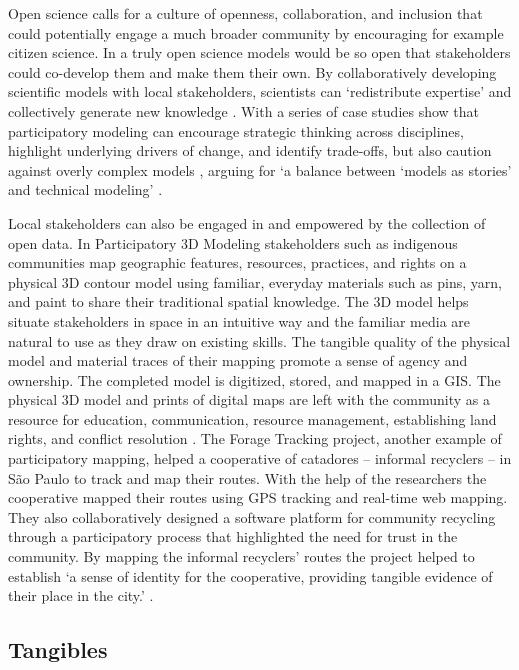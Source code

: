 \documentclass{article}
\begin{document}
Open science calls for a culture of openness, collaboration, and inclusion
that could potentially engage a much broader community 
by encouraging for example citizen science. 
%
In a truly open science
models would be so open that stakeholders could co-develop them
and make them their own. 
%
By collaboratively developing scientific models 
with local stakeholders, scientists can 
`redistribute expertise' 
and collectively generate new knowledge \citep{Whatmore2011, Landstrom2011}. 
%
With a series of case studies 
\citeauthor{Sandker2010} show
that participatory modeling can 
encourage strategic thinking across disciplines, 
highlight underlying drivers of change, 
and identify trade-offs,
but also caution against overly complex models
, arguing for 
`a balance between `models as stories' and technical
modeling'
\citeyearpar{Sandker2010}.  
%

Local stakeholders can also be engaged in and empowered by the collection of open data. 
%
In Participatory 3D Modeling stakeholders such as indigenous communities 
map 
geographic features, resources, practices, and rights 
on a physical 3D contour model 
using familiar, everyday materials such as pins, yarn, and paint 
to share their traditional spatial knowledge. 
The 3D model helps situate stakeholders in space in an intuitive way
and the familiar media are natural to use as they draw on existing skills.
The tangible quality of the physical model and material traces of their mapping 
promote a sense of agency and ownership. 
%
The completed model is digitized, stored, and mapped in a GIS. 
The physical 3D model and prints of digital maps are left with the community
as a resource for
education, communication, resource management, establishing land rights, and conflict resolution 
\citep{Rambaldi2001}.
%
The Forage Tracking project, another example of participatory mapping, helped a cooperative of catadores -- informal recyclers -- 
in S\~{a}o Paulo to track and map their routes.
%
With the help of the researchers the cooperative mapped their routes using GPS tracking and real-time web mapping.
They also collaboratively designed a software platform for community recycling 
through a participatory process that highlighted the need for trust in the community. 
By mapping the informal recyclers' routes 
the project helped to establish 
`a sense of identity for the cooperative,
providing tangible evidence of their place in the city.'
\citep{mit2012,Offenhuber2012}.
%

\subsection{Tangibles}
\end{document}
